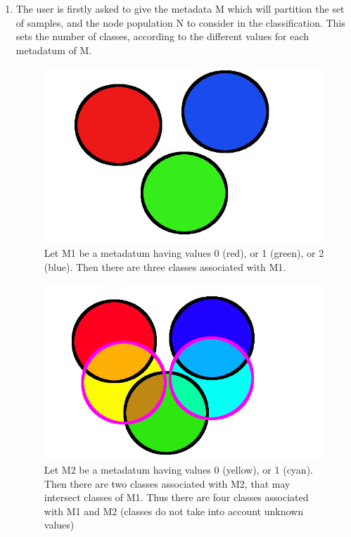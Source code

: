 \documentclass{report}
\begin{document}
\begin{enumerate}
\item The user is firstly asked to give the metadata \textsc{M} which will partition the set of samples, and the node population \textsc{N} to consider in the classification. This sets the number of classes, according to the different values for each metadatum of \textsc{M}.

\begin{figure}[H]
\centering
\includegraphics[scale=0.3]{illustrations/classessimples.png}
\caption{Let \textsc{M1} be a metadatum having values 0 (red), or 1 (green), or 2 (blue). Then there are three classes associated with \textsc{M1}.}
\end{figure}

\begin{figure}[H]
\centering
\includegraphics[scale=0.3]{illustrations/classescomplexes.png}
\caption{Let M2 be a metadatum having values 0 (yellow), or 1 (cyan). Then there are two classes associated with M2, that may intersect classes of M1. Thus there are four classes associated with M1 and M2 (classes do not take into account unknown values)}
\end{figure}


\end{enumerate}
\end{document}
